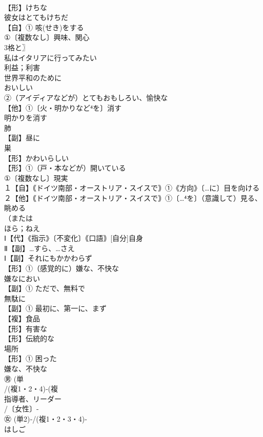 \documentclass[8pt]{extreport}
\begin{document}
\begin{CJK}{UTF8}{min}
\\	【形】けちな 
\\	彼女はとてもけちだ 
\\	【自】① 咳(せき)をする
\\	①〔複数なし〕興味、関心
\\	3格と〗
\\	私はイタリアに行ってみたい 
\\	利益；利害　
\\	世界平和のために 
\\	おいしい 
\\	②（アイディアなどが）とてもおもしろい、愉快な 
\\	【他】①〔火・明かりなど⁴を〕消す 
\\	明かりを消す 
\\	肺 
\\	【副】昼に 
\\	巣 
\\	【形】かわいらしい
\\	【形】①（戸・本などが）開いている
\\	①〔複数なし〕現実
\\	１【自】｟ドイツ南部・オーストリア・スイスで｠①《方向》〔…に〕目を向ける ２【他】｟ドイツ南部・オーストリア・スイスで｠①〔…⁴を〕（意識して）見る、眺める 
\\	（または
\\	ほら；ねえ
\\	Ⅰ【代】《指示》〔不変化〕｟口語｠[自分]自身 
\\	Ⅱ【副】…すら、…さえ
\\	Ⅰ【副】それにもかかわらず
\\	【形】①（感覚的に）嫌な、不快な 
\\	嫌なにおい
\\	【副】① ただで、無料で　　
\\	無駄に 
\\	【副】① 最初に、第一に、まず
\\	【複】食品
\\	【形】有害な 
\\	【形】伝統的な
\\	場所
\\	【形】① 困った
\\	嫌な、不快な
\\	㊚ (単
\\	/(複1・2・4)‐(複
\\	指導者、リーダー 
\\	/〔女性〕-
\\	㊛ (単2)‐/(複1・2・3・4)‐
\\	はしご

\end{CJK}
\end{document}
